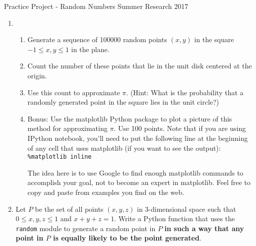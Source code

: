 \documentclass[12pt]{article}
\theoremstyle{plain}
\theoremstyle{definition}
\begin{document}
\begin{center}
{\large Practice Project - Random Numbers} \linebreak Summer Research 2017
\end{center}

\begin{enumerate}

\item 
\begin{enumerate}
\item Generate a sequence of 100000 random points $(x,y)$ in the square $-1\leq x,y\leq 1$ in the plane.  
\item Count the number of these points that lie in the unit disk centered at the origin.
\item Use this count to approximate $\pi$.  (Hint: What is the probability that a randomly generated point in the square lies in the unit circle?)
\item Bonus: Use the matplotlib Python package to plot a picture of this method for approximating $\pi$.  Use 100 points.  Note that if you are using IPython notebook, you'll need to put the following line at the beginning of any cell that uses matplotlib (if you want to see the output): \verb+%matplotlib inline+

The idea here is to use Google to find enough matplotlib commands to accomplish your goal, not to become an expert in matplotlib.  Feel free to copy and paste from examples you find on the web.  
\end{enumerate}

\item Let $P$ be the set of all points $(x,y,z)$ in 3-dimensional space such that $0\leq x,y,z\leq 1$ and $x+y+z=1$.  Write a Python function that uses the \verb+random+ module to generate a random point in $P$ \textbf{in such a way that any point in $P$ is equally likely to be the point generated}.  

\end{enumerate}
\end{document}
